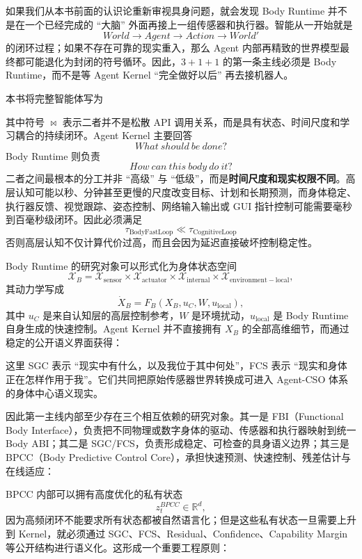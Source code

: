 如果我们从本书前面的认识论重新审视具身问题，就会发现 Body Runtime 并不是在一个已经完成的 ``大脑'' 外面再接上一组传感器和执行器。智能从一开始就是
\[
World \rightarrow Agent \rightarrow Action \rightarrow World'
\]
的闭环过程；如果不存在可靠的现实重入，那么 Agent 内部再精致的世界模型最终都可能退化为封闭的符号循环。因此，$3+1+1$ 的第一条主线必须是 Body Runtime，而不是等 Agent Kernel ``完全做好以后'' 再去接机器人。

本书将完整智能体写为
\begin{statementbox}
\centering
{}
\end{statementbox}
其中符号 $\bowtie$ 表示二者并不是松散 API 调用关系，而是具有状态、时间尺度和学习耦合的持续闭环。Agent Kernel 主要回答
\[
What\ should\ be\ done?
\]
Body Runtime 则负责
\[
How\ can\ this\ body\ do\ it?
\]
二者之间最根本的分工并非 ``高级'' 与 ``低级''，而是\textbf{时间尺度和现实权限不同}。高层认知可能以秒、分钟甚至更慢的尺度改变目标、计划和长期预测，而身体稳定、执行器反馈、视觉跟踪、姿态控制、网络输入输出或 GUI 指针控制可能需要毫秒到百毫秒级闭环。因此必须满足
\[
\boxed{
\tau_{\mathrm{BodyFastLoop}}
\ll
\tau_{\mathrm{CognitiveLoop}}
}
\]
否则高层认知不仅计算代价过高，而且会因为延迟直接破坏控制稳定性。

Body Runtime 的研究对象可以形式化为身体状态空间
\[
\mathcal X_B
=
\mathcal X_{\mathrm{sensor}}
\times
\mathcal X_{\mathrm{actuator}}
\times
\mathcal X_{\mathrm{internal}}
\times
\mathcal X_{\mathrm{environment-local}},
\]
其动力学写成
\[
\dot X_B
=
F_B
\left(
X_B,
u_C,
W,
u_{\mathrm{local}}
\right),
\]
其中 $u_C$ 是来自认知层的高层控制参考，$W$ 是环境扰动，$u_{\mathrm{local}}$ 是 Body Runtime 自身生成的快速控制。Agent Kernel 并不直接拥有 $X_B$ 的全部高维细节，而通过稳定的公开语义界面获得：
\begin{statementbox}
\centering
{}
\end{statementbox}
这里 SGC 表示 ``现实中有什么，以及我位于其中何处''，FCS 表示 ``现实和身体正在怎样作用于我''。它们共同把原始传感器世界转换成可进入 Agent-CSO 体系的身体中心语义现实。

因此第一主线内部至少存在三个相互依赖的研究对象。其一是 FBI（Functional Body Interface），负责把不同物理或数字身体的驱动、传感器和执行器映射到统一 Body ABI；其二是 SGC/FCS，负责形成稳定、可检查的具身语义边界；其三是 BPCC（Body Predictive Control Core），承担快速预测、快速控制、残差估计与在线适应：
\begin{statementbox}
\centering
{}
\end{statementbox}
BPCC 内部可以拥有高度优化的私有状态
\[
z_t^{BPCC}\in\mathbb R^d,
\]
因为高频闭环不能要求所有状态都被自然语言化；但是这些私有状态一旦需要上升到 Kernel，就必须通过 SGC、FCS、Residual、Confidence、Capability Margin 等公开结构进行语义化。这形成一个重要工程原则：
\begin{statementbox}
\centering
{}
\end{statementbox}

